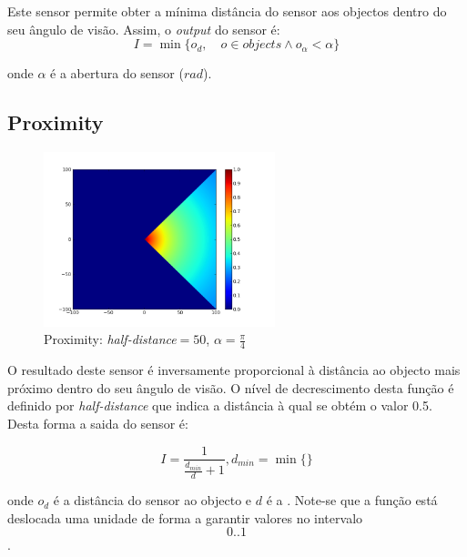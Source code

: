 \documentclass[a4paper]{article}
\begin{document}
\indent Este sensor permite obter a mínima distância do sensor aos objectos dentro do seu ângulo de visão.
Assim, o \emph{output} do sensor é:
\[
	I = \min\{o_{d},\quad o \in objects \land o_{\alpha} < \alpha\}
\] 

onde $\alpha$ é a abertura do sensor ($rad$).

\cleardoublepage
\subsection{Proximity}
\begin{figure}[h]
	\vspace{-20pt}
	\begin{center}
		\includegraphics[width=0.6\textwidth]{graphs/sensors/proximity.png}
	\end{center}
	\vspace{-20pt}
	\caption{Proximity: \emph{half-distance}$=50$, $\alpha=\frac{\pi}{4}$}
\end{figure}

\indent O resultado deste sensor é inversamente proporcional à distância ao objecto mais próximo dentro do seu ângulo de visão.
O nível de decrescimento desta função é definido por \emph{half-distance} que indica a distância à qual se obtém o valor 0.5.
Desta forma a saida do sensor é:

\[
	I = \frac{1}{\frac{d_{min}}{d}+1}, d_{min} = \min\{\}
\]

onde $o_{d}$ é a distância do sensor ao objecto e $d$ é a .
Note-se que a função está deslocada uma unidade de forma a garantir valores no intervalo \[0..1\].

\cleardoublepage
\end{document}

